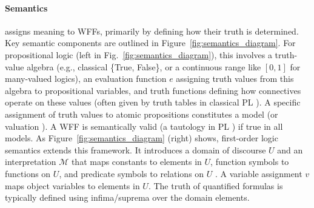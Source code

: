 \paragraph{Semantics} assigns meaning to WFFs, primarily by defining how their truth is determined. Key semantic components are outlined in Figure~\ref{fig:semantics_diagram}. For propositional logic (left in Fig.~\ref{fig:semantics_diagram}), this involves a truth-value algebra (e.g., classical \{True, False\}, or a continuous range like $[0,1]$ for many-valued logics), an evaluation function $e$ assigning truth values from this algebra to propositional variables, and truth functions defining how connectives operate on these values (often given by truth tables in classical PL \cite[Sec.~3.1-3.2]{Agler2013SymbolicLogic}). A specific assignment of truth values to atomic propositions constitutes a model (or valuation \cite[Sec.~3.1]{Agler2013SymbolicLogic}). A WFF is semantically valid (a tautology in PL \cite[Sec.~3.3.1]{Agler2013SymbolicLogic}) if true in all models. As Figure~\ref{fig:semantics_diagram} (right) shows, first-order logic semantics extends this framework. It introduces a domain of discourse $U$ and an interpretation $\mathcal{M}$ that maps constants to elements in $U$, function symbols to functions on $U$, and predicate symbols to relations on $U$ \cite[Ch.~6.4]{Agler2013SymbolicLogic}. A variable assignment $v$ maps object variables to elements in $U$. The truth of quantified formulas is typically defined using infima/suprema over the domain elements.


